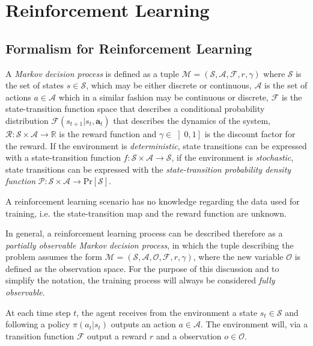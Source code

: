 \chapter{Reinforcement Learning}


\section{Formalism for Reinforcement Learning}

A \textit{Markov decision process} is defined as a tuple $\mathcal{M} = (\mathcal{S}, \mathcal{A}, \mathcal{F}, r, \gamma)$ where $\mathcal{S}$ is the set of states $s \in \mathcal{S}$, which may be either discrete or continuous, $\mathcal{A}$ is the set of actions $a \in \mathcal{A}$ which in a similar fashion may be continuous or discrete, $\mathcal{F}$ is the state-transition function space that describes a conditional probability distribution $\mathcal{F}(s _{t+1}|s_t, \mathbf{a} _t)$ that describes the dynamics of the system, $\mathcal{R} : \mathcal{S} \times \mathcal{A} \rightarrow \mathbb{R}$ is the reward function and $\gamma \in \left]0,1\right]$ is the discount factor for the reward. If the environment is \textit{deterministic}, state transitions can be expressed with a state-transition function $f: \mathcal{S} \times \mathcal{A} \rightarrow \mathcal{S}$, if the environment is \textit{stochastic}, state transitions can be expressed with the \textit{state-transition probability density function} $\mathcal{P}: \mathcal{S} \times \mathcal{A} \rightarrow \mathrm{Pr}[\mathcal{S}]$.



A reinforcement learning scenario has no knowledge regarding the data used for training, i.e. the state-transition map and the reward function are unknown.

In general, a reinforcement learning process can be described therefore as a \textit{partially observable Markov decision process}, in which the tuple describing the problem assumes the form $\mathcal{M} =  (\mathcal{S}, \mathcal{A}, \mathcal{O}, \mathcal{F}, r, \gamma)$, where the new variable $\mathcal{O}$ is defined as the observation space. For the purpose of this discussion and to simplify the notation, the training process will always be considered \textit{fully observable}.

At each time step $t$, the agent receives from the environment a state $s_t \in \mathcal{S}$ and following a policy $\pi (a_t | s_t)$ outputs an action $a \in \mathcal{A}$. The environment will, via a transition function $\mathcal{F}$ output a reward $r$ and a observation $o \in \mathcal{O}$.


